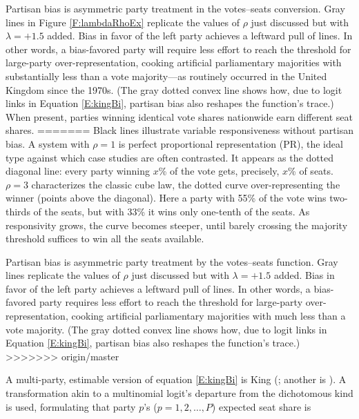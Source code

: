 \documentclass[letter,12pt]{article}
\begin{document}
Partisan bias is asymmetric party treatment in the votes--seats conversion. Gray lines in Figure \ref{F:lambdaRhoEx} replicate the values of $\rho$ just discussed but with $\lambda = +1.5$ added. Bias in favor of the left party achieves a leftward pull of lines. In other words, a bias-favored party will require less effort to reach the threshold for large-party over-representation, cooking artificial parliamentary majorities with substantially less than a vote majority---as routinely occurred in the United Kingdom since the 1970s. (The gray dotted convex line shows how, due to logit links in Equation \ref{E:kingBi}, partisan bias also reshapes the function's trace.) When present, parties winning identical vote shares nationwide earn different seat shares. 
=======
Black lines illustrate variable responsiveness without partisan bias. A system with $\rho=1$ is perfect proportional representation (PR), the ideal type against which case studies are often contrasted. It appears as the dotted diagonal line: every party winning $x$\% of the vote gets, precisely, $x$\% of seats. $\rho=3$ characterizes the classic cube law, the dotted curve over-representing the winner (points above the diagonal). Here a party with 55\% of the vote wins two-thirds of the seats, but with 33\% it wins only one-tenth of the seats. As responsivity grows, the curve becomes steeper, until barely crossing the majority threshold suffices to win all the seats available. 

Partisan bias is asymmetric party treatment by the votes--seats function. Gray lines replicate the values of $\rho$ just discussed but with $\lambda = +1.5$ added. Bias in favor of the left party achieves a leftward pull of lines. In other words, a bias-favored party requires less effort to reach the threshold for large-party over-representation, cooking artificial parliamentary majorities with much less than a vote majority. (The gray dotted convex line shows how, due to logit links in Equation \ref{E:kingBi}, partisan bias also reshapes the function's trace.) %
>>>>>>> origin/master

A multi-party, estimable version of equation \ref{E:kingBi} is King (\citeyear{king.1990elRespBiasMultiparty}; another is \citeauthor{calvo.micozzi.govReform.2005} \citeyear{calvo.micozzi.govReform.2005}). A transformation akin to a multinomial logit's departure from the dichotomous kind is used, formulating that party $p$'s ($p=1,2,\ldots,P$) expected seat share is 
\end{document}
